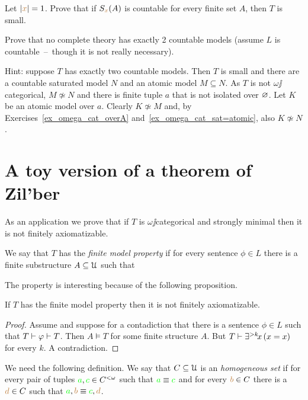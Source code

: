 \documentclass[creche.tex]{subfiles}
\begin{document}
\begin{exercise}
Let $|{\color{brown} x}|=1$. Prove that if $S_{{\color{brown} x}}(A)$ is countable for every finite set $A$, then $T$ is small.\QED
\end{exercise}


\begin{exercise}[(Vaught)]
Prove that no complete theory has exactly 2 countable models (assume $L$ is countable~--~though it is not really necessary).

Hint: suppose $T$ has exactly two countable models. Then $T$ is small and there are a countable saturated model $N$ and an atomic model $M\subseteq N$. As $T$ is not $\omega\jj$categorical, $M\not\simeq N$ and there is finite tuple $a$ that is not isolated over $\varnothing$. Let $K$ be an atomic model over $a$. Clearly $K\not\simeq M$ and, by Exercises~\ref{ex_omega_cat_overA} and~\ref{ex_omega_cat_sat=atomic}, also $K\not\simeq N$.\QED
\end{exercise}

\section{A toy version of a theorem of Zil'ber}

As an application we prove that if $T$ is $\omega\jj$categorical and strongly minimal then it is not finitely axiomatizable.

We say that $T$ has the \emph{finite model property\/} if for every sentence $\phi\in L$ there is a finite substructure $A\subseteq\EuScript U$ such that 


The property is interesting because of the following proposition.

\begin{proposition}\label{prop_fmp_fa}
If $T$ has the finite model property then it is not finitely axiomatizable.
\end{proposition}
\begin{proof}
Assume  and suppose for a contadiction that there is a sentence $\phi\in L$ such that $T\vdash\varphi\vdash T$. Then $A\models T$ for some finite structure $A$. But $T\vdash \exists^{>k}\!x\,(x=x)$ for every $k$. A contradiction.
\end{proof}
We need the following definition. We say that $C\subseteq\EuScript U$ is an \emph{homogeneous set\/} if for every pair of tuples  ${\color{green} a},{\color{green} c}\in C^{<\omega}$ such that ${\color{green} a}\equiv{\color{green}c}$ and for every ${\color{brown} b}\in C$ there is a ${\color{brown} d}\in C$ such that ${\color{green} a},{\color{brown} b}\equiv {\color{green}c},{\color{brown} d}$.
\end{document}
